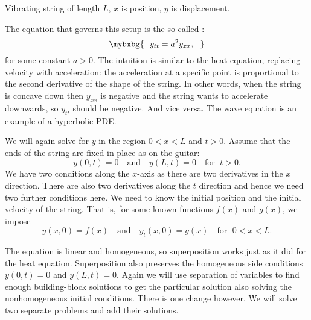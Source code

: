 \begin{myfig}
\capstart
{}
\caption{Vibrating string of length $L$, $x$ is position, $y$ is displacement.\label{we:vibstrfig}}
\end{myfig}

The equation that governs this setup is the so-called
\emph{}:
\begin{equation*}
\mybxbg{~~
y_{tt} =
a^2 y_{xx} ,
~~}
\end{equation*}
for some constant $a > 0$.
The intuition is similar to the heat equation, replacing velocity with
acceleration: the acceleration at a specific point is proportional to the second
derivative of the shape of the string.  In other words,
when the string is
concave down then $y_{xx}$ is negative and the string wants to accelerate
downwards, so $y_{tt}$ should be negative.  And vice versa.
The wave equation is an example of a hyperbolic PDE.

We will again solve for $y$ in the region $0 < x < L$ and $t > 0$.
Assume that the ends of the string are fixed in place as on the guitar:
\begin{equation*}
y(0,t) = 0 \quad \text{and} \quad y(L,t) = 0 \quad \text{for } \; t > 0.
\end{equation*}
We have two conditions along the $x$-axis as there are
two derivatives in the $x$ direction.
There are also two derivatives along the $t$ direction and hence we need
two further conditions here.  We need to know the initial position
and the initial velocity of the string.  That is,
for some known functions $f(x)$ and $g(x)$, we impose
\begin{equation*}
y(x,0) = f(x)  \quad \text{and} \quad y_t (x,0) = g(x)
\quad \text{for } \; 0 < x < L .
\end{equation*}

The equation is linear and homogeneous,
so superposition works just as it did for the
heat equation.
Superposition also preserves the homogeneous 
side conditions $y(0,t)=0$ and $y(L,t)=0$.
Again we will use separation of variables to find
enough building-block solutions to get the particular solution
also solving the nonhomogeneous initial conditions.  There is
one change however.  We will solve two separate problems
and add their solutions.

